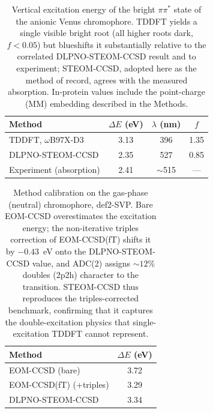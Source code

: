 \documentclass[journal=jpcbfk, manuscript=article, layout=twocolumn, doi=true]{achemso}
\begin{document}
\begin{table}[t]
\centering
\caption{Vertical excitation energy of the bright $\pi\pi^{*}$ state of the anionic Venus chromophore. TDDFT yields a single visible bright root (all higher roots dark, $f<0.05$) but blueshifts it substantially relative to the correlated DLPNO-STEOM-CCSD result and to experiment; STEOM-CCSD, adopted here as the method of record, agrees with the measured absorption. In-protein values include the point-charge (MM) embedding described in the Methods.}
\label{tab:roots}
{\small\setlength{\tabcolsep}{3pt}
\begin{tabular}{lccc}
\toprule
Method & $\Delta E$ (eV) & $\lambda$ (nm) & $f$ \\
\midrule
TDDFT, $\omega$B97X-D3      & 3.13 & 396 & 1.35 \\
DLPNO-STEOM-CCSD            & 2.35 & 527 & 0.85 \\
Experiment (absorption)    & 2.41 & $\sim$515 & --- \\
\bottomrule
\end{tabular}}
\end{table}

\begin{table}[t]
\centering
\caption{Method calibration on the gas-phase (neutral) chromophore, def2-SVP. Bare EOM-CCSD overestimates the excitation energy; the non-iterative triples correction of EOM-CCSD(fT) shifts it by $-0.43$~eV onto the DLPNO-STEOM-CCSD value, and ADC(2) assigns ${\sim}12\%$ doubles (2p2h) character to the transition. STEOM-CCSD thus reproduces the triples-corrected benchmark, confirming that it captures the double-excitation physics that single-excitation TDDFT cannot represent.}
\label{tab:ladder}
\begin{tabular}{lc}
\toprule
Method & $\Delta E$ (eV) \\
\midrule
EOM-CCSD (bare)          & 3.72 \\
EOM-CCSD(fT) (+triples)  & 3.29 \\
DLPNO-STEOM-CCSD         & 3.34 \\
\bottomrule
\end{tabular}
\end{table}
\end{document}
